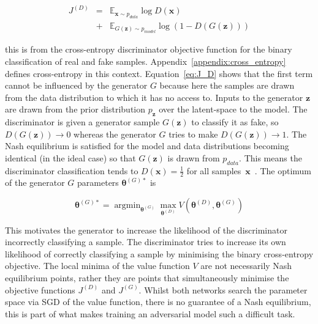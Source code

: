 \documentclass[twocolumn]{article}
\DeclareMathOperator*{\argmin}{\text{argmin}}
\numberwithin{equation}{section}
\begin{document}
\begin{eqnarray}\label{eq:J_D}
    J^{(D)} &=& \mathbb{E}_{\mathbf{x} \sim p_{data}}\log D(\mathbf{x})  \nonumber \\
            &+&\mathbb{E}_{G(\mathbf{z}) \sim p_{model}}\log (1 - D(G(\mathbf{z})))
\end{eqnarray}

this is from the cross-entropy discriminator objective function for the binary classification of real and fake 
samples. Appendix~\ref{appendix:cross_entropy} defines cross-entropy in this context. Equation~\ref{eq:J_D} shows that the first 
term cannot be influenced by the generator $G$ because here the samples are drawn from the data distribution to which 
it has no access to. Inputs to the generator $\mathbf{z}$ are drawn from the prior distribution $p_\mathbf{z}$ over 
the latent-space to the model. The discriminator is given a generator sample $G(\mathbf{z})$ to classify it as fake, 
so $D(G(\mathbf{z})) \! \rightarrow \! 0$ whereas the generator $G$ tries to make $D(G(\mathbf{z})) \!  \rightarrow \! 1$. 
The Nash equilibrium is satisfied for the model and data distributions becoming identical (in the ideal case) so that 
$G(\mathbf{z})$ is drawn from $p_{data}$. This means the discriminator classification tends to $D(\mathbf{x}) = 
\frac{1}{2}$ for all samples~$\mathbf{x}$~\cite{gf_gan}. The optimum of the generator $G$ parameters 
$\bm{\theta}^{(G)*}$ is 

\begin{equation}
    \bm{\theta}^{(G)*} = \argmin_{\mathbf{\theta}^{(G)}}\max_{\mathbf{\theta}^{(D)}}
                          V({\mathbf{\theta}^{(D)}},{\mathbf{\theta}^{(G)}})
\end{equation}

This motivates the generator to increase the likelihood of the discriminator incorrectly classifying a sample. The 
discriminator tries to increase its own likelihood of correctly classifying a sample by minimising the binary 
cross-entropy objective. The local minima of the value function $V$ are not necessarily Nash equilibrium points, rather
they are points that simultaneously minimise the objective functions $J^{(D)}$ and $J^{(G)}$. Whilst both networks search 
the parameter space via SGD of the value function, there is no guarantee of a Nash equilibrium, this is part of what makes 
training an adversarial model such a difficult task.

\end{document}
